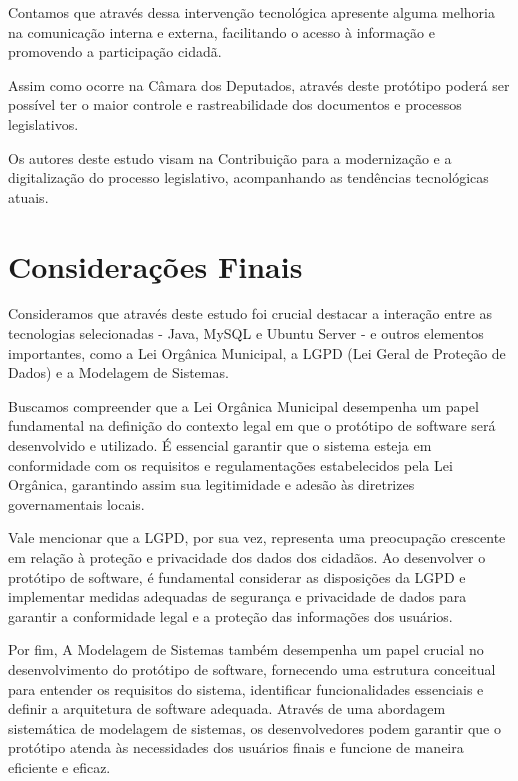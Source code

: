 \documentclass[12pt]{article}
\begin{document}
Contamos que através dessa intervenção tecnológica apresente alguma melhoria na comunicação interna e externa, facilitando o acesso à informação e promovendo a participação cidadã.

Assim como ocorre na Câmara dos Deputados, através deste protótipo poderá ser possível ter o maior controle e rastreabilidade dos documentos e processos legislativos.

Os autores deste estudo visam na Contribuição para a modernização e a digitalização do processo legislativo, acompanhando as tendências tecnológicas atuais.

\section{Considerações Finais}

Consideramos que através deste estudo foi crucial destacar a interação entre as tecnologias selecionadas - Java, MySQL e Ubuntu Server - e outros elementos importantes, como a Lei Orgânica Municipal, a LGPD (Lei Geral de Proteção de Dados) e a Modelagem de Sistemas.

Buscamos compreender que a Lei Orgânica Municipal desempenha um papel fundamental na definição do contexto legal em que o protótipo de software será desenvolvido e utilizado. É essencial garantir que o sistema esteja em conformidade com os requisitos e regulamentações estabelecidos pela Lei Orgânica, garantindo assim sua legitimidade e adesão às diretrizes governamentais locais.

Vale mencionar que a LGPD, por sua vez, representa uma preocupação crescente em relação à proteção e privacidade dos dados dos cidadãos. Ao desenvolver o protótipo de software, é fundamental considerar as disposições da LGPD e implementar medidas adequadas de segurança e privacidade de dados para garantir a conformidade legal e a proteção das informações dos usuários.

Por fim, A Modelagem de Sistemas também desempenha um papel crucial no desenvolvimento do protótipo de software, fornecendo uma estrutura conceitual para entender os requisitos do sistema, identificar funcionalidades essenciais e definir a arquitetura de software adequada. Através de uma abordagem sistemática de modelagem de sistemas, os desenvolvedores podem garantir que o protótipo atenda às necessidades dos usuários finais e funcione de maneira eficiente e eficaz.


\printbibliography
\end{document}
